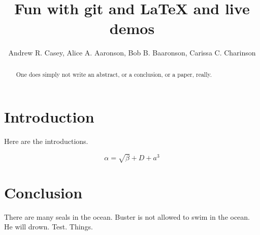 \documentclass{article}
\begin{document}
\title{Fun with git and \LaTeX{} and live demos}
\author{Andrew R. Casey, Alice A. Aaronson, Bob B. Baaronson, Carissa C. Charinson}

\maketitle

\begin{abstract}
One does simply not write an abstract, or a conclusion, or a paper, really.
\end{abstract}

\section{Introduction}
Here are the introductions.

\begin{equation}
    \label{simple_equation}
    \alpha = \sqrt{ \beta } + D + a^3
\end{equation}


\section{Conclusion}
There are many seals in the ocean. Buster is not allowed to swim in the ocean. He will drown.
Test. Things.
\end{document}
